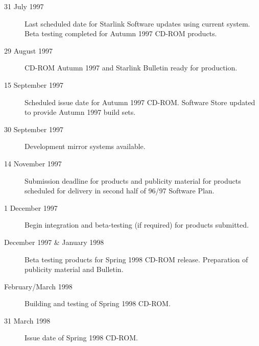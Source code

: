 \documentclass[twoside,11pt]{article}
\begin{document}
\begin{description}

\item[31 July 1997]
   Last scheduled date for Starlink Software updates using current system.
   Beta testing completed for Autumn 1997 CD-ROM products.

\item[29 August 1997]
   CD-ROM Autumn 1997 and Starlink Bulletin ready for production.

\item[15 September 1997]
   Scheduled issue date for Autumn 1997 CD-ROM.  Software Store updated to 
   provide Autumn 1997 build sets.

\item[30 September 1997]
   Development mirror systems available.

\item[14 November 1997]
   Submission deadline for products and publicity material for products
   scheduled for delivery in second half of 96/97 Software Plan.

\item[1 December 1997]
   Begin integration and beta-testing (if required) for products submitted.

\item[December 1997 \& January 1998]
   Beta testing products for Spring 1998 CD-ROM release.  
   Preparation of publicity material and Bulletin.

\item[February/March 1998]
   Building and testing of Spring 1998 CD-ROM.

\item[31 March 1998]
   Issue date of Spring 1998 CD-ROM.

\end{description}
\end{document}
